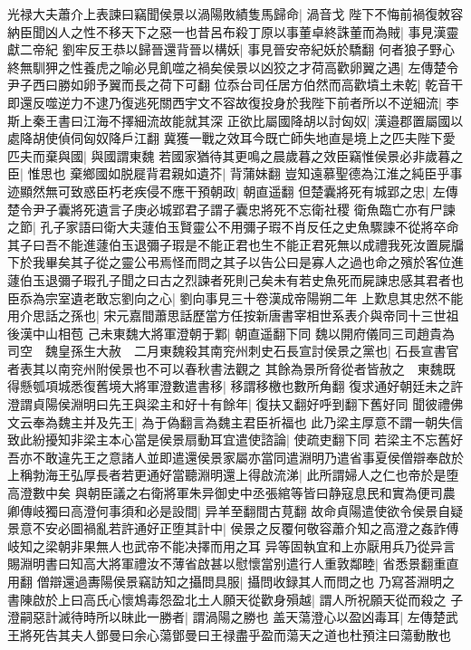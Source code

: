 光禄大夫蕭介上表諫曰竊聞侯景以渦陽敗績隻馬歸命|{
	渦音戈}
陛下不悔前禍復敇容納臣聞凶人之性不移天下之惡一也昔呂布殺丁原以事董卓終誅董而為賊|{
	事見漢靈獻二帝紀}
劉牢反王恭以歸晉還背晉以構妖|{
	事見晉安帝紀妖於驕翻}
何者狼子野心終無馴狎之性養虎之喻必見飢噬之禍矣侯景以凶狡之才荷高歡卵翼之遇|{
	左傳楚令尹子西曰勝如卵予翼而長之荷下可翻}
位忝台司任居方伯然而高歡墳土未乾|{
	乾音干}
即還反噬逆力不逮乃復逃死關西宇文不容故復投身於我陛下前者所以不逆細流|{
	李斯上秦王書曰江海不擇細流故能就其深}
正欲比屬國降胡以討匈奴|{
	漢邉郡置屬國以處降胡使偵伺匈奴降戶江翻}
冀獲一戰之效耳今既亡師失地直是境上之匹夫陛下愛匹夫而棄與國|{
	與國謂東魏}
若國家猶待其更鳴之晨歲暮之效臣竊惟侯景必非歲暮之臣|{
	惟思也}
棄鄉國如脱屣背君親如遺芥|{
	背蒲妹翻}
豈知遠慕聖德為江淮之純臣乎事迹顯然無可致惑臣朽老疾侵不應干預朝政|{
	朝直遥翻}
但楚囊將死有城郢之忠|{
	左傳楚令尹子囊將死遺言子庚必城郢君子謂子囊忠將死不忘衛社稷}
衛魚臨亡亦有尸諫之節|{
	孔子家語曰衛大夫蘧伯玉賢靈公不用彌子瑕不肖反任之史魚驟諫不從將卒命其子曰吾不能進蘧伯玉退彌子瑕是不能正君也生不能正君死無以成禮我死汝置屍牖下於我畢矣其子從之靈公弔焉怪而問之其子以告公曰是寡人之過也命之殯於客位進蘧伯玉退彌子瑕孔子聞之曰古之烈諫者死則己矣未有若史魚死而屍諫忠感其君者也}
臣忝為宗室遺老敢忘劉向之心|{
	劉向事見三十卷漢成帝陽朔二年}
上歎息其忠然不能用介思話之孫也|{
	宋元嘉間蕭思話歷當方任按新唐書宰相世系表介與帝同十三世祖後漢中山相苞}
己未東魏大將軍澄朝于鄴|{
	朝直遥翻下同}
魏以開府儀同三司趙貴為司空　魏皇孫生大赦　二月東魏殺其南兖州刺史石長宣討侯景之黨也|{
	石長宣書官者表其以南兖州附侯景也不可以春秋書法觀之}
其餘為景所脅從者皆赦之　東魏既得懸瓠項城悉復舊境大將軍澄數遣書移|{
	移謂移檄也數所角翻}
復求通好朝廷未之許澄謂貞陽侯淵明曰先王與梁主和好十有餘年|{
	復扶又翻好呼到翻下舊好同}
聞彼禮佛文云奉為魏主并及先王|{
	為于偽翻言為魏主君臣祈福也}
此乃梁主厚意不謂一朝失信致此紛擾知非梁主本心當是侯景扇動耳宜遣使諮論|{
	使疏吏翻下同}
若梁主不忘舊好吾亦不敢違先王之意諸人並即遣還侯景家屬亦當同遣淵明乃遣省事夏侯僧辯奉啟於上稱勃海王弘厚長者若更通好當聽淵明還上得啟流涕|{
	此所謂婦人之仁也帝於是堕高澄數中矣}
與朝臣議之右衛將軍朱异御史中丞張綰等皆曰静寇息民和實為便司農卿傳岐獨曰高澄何事須和必是設間|{
	异羊至翻間古莧翻}
故命貞陽遣使欲令侯景自疑景意不安必圖禍亂若許通好正堕其計中|{
	侯景之反覆何敬容蕭介知之高澄之姦詐傅岐知之梁朝非果無人也武帝不能决擇而用之耳}
异等固執宜和上亦厭用兵乃從异言賜淵明書曰知高大將軍禮汝不薄省啟甚以慰懷當别遣行人重敦鄰睦|{
	省悉景翻重直用翻}
僧辯還過夀陽侯景竊訪知之攝問具服|{
	攝問收録其人而問之也}
乃寫荅淵明之書陳啟於上曰高氏心懷鴆毒怨盈北土人願天從歡身殞越|{
	謂人所祝願天從而殺之}
子澄嗣惡計滅待時所以昧此一勝者|{
	謂渦陽之勝也}
盖天蕩澄心以盈凶毒耳|{
	左傳楚武王將死告其夫人鄧曼曰余心蕩鄧曼曰王禄盡乎盈而蕩天之道也杜預注曰蕩動散也}
